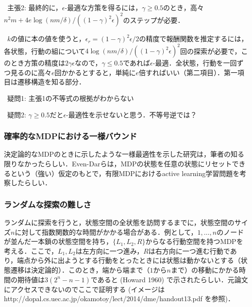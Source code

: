 \documentclass{jsarticle}
\begin{document}
\begin{itemize}
\begin{itemize}
\ 主張2: 最終的に，$\epsilon$-最適な方策を得るには，$\gamma \ge 0.5$のとき，高々$n^2m + 4e\log(nm/\delta)/((1-\gamma)^2\epsilon)^2$のステップが必要．

\ $k$の値に本の値を使うと，$\epsilon_r = (1-\gamma)^2\epsilon/2$の精度で報酬関数を推定するには，各状態，行動の組について$4\log(nm/\delta)/((1-\gamma)^2\epsilon)^2$回の探索が必要で，このとき方策の精度は$2\gamma\epsilon$なので，$\gamma \le 0.5$であれば$\epsilon$-最適．全状態，行動を一回ずつ見るのに高々$e$回かかるとすると，単純に$e$倍すればいい（第二項目）．第一項目は遷移構造を知る部分．

\ 疑問1: 主張1の不等式の根拠がわからない

\ 疑問2: $\gamma \ge 0.5$だと$\epsilon$-最適性を示せないと思う．不等号逆では？
\end{itemize}
\end{itemize}

\subsubsection*{確率的なMDPにおける一様バウンド}
決定論的なMDPのときに示したような一様最適性を示した研究は，筆者の知る限りなかったらしい．Even-Darらは，MDPの状態を任意の状態にリセットできるという（強い）仮定のもとで，有限MDPにおけるactive learning学習問題を考察したらしい．

\subsubsection*{ランダムな探索の難しさ}
ランダムに探索を行うと，状態空間の全状態を訪問するまでに，状態空間のサイズ$n$に対して指数関数的な時間がかかる場合がある．例として，$1,\ldots,n$のノードが並んだ一本鎖の状態空間を持ち，$\{L_1,L_2,R\}$からなる行動空間を持つMDPを考える．ここで，$L_1,L_2$は左方向に一つ進み，$R$は右方向に一つ進む行動であり，端点から外に出ようとする行動をとったときには状態は動かないとする（状態遷移は決定論的）．このとき，端から端まで（$1$から$n$まで）の移動にかかる時間の期待値は$3(2^n-n-1)$であると (Howard 1960) で示されたらしい．元論文にアクセスできないのでここで証明する (イメージは http://dopal.cs.uec.ac.jp/okamotoy/lect/2014/dme/handout13.pdf を参照)．
\end{document}
